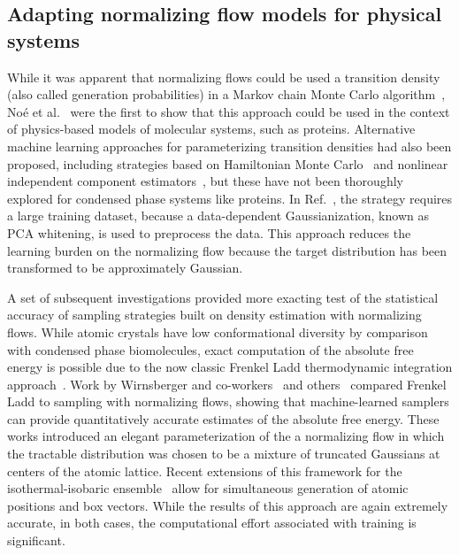 \documentclass[11pt]{article}
\begin{document}
\subsection{Adapting normalizing flow models for physical systems}

While it was apparent that normalizing flows could be used a transition density (also called generation probabilities) in a Markov chain Monte Carlo algorithm~\cite{rezende_variational_2015}, No\'{e} et al.~\cite{noe_boltzmann_2019} were the first to show that this approach could be used in the context of physics-based models of molecular systems, such as proteins.
Alternative machine learning approaches for parameterizing transition densities had also been proposed, including strategies based on Hamiltonian Monte Carlo~\cite{levy_generalizing_2018} and nonlinear independent component estimators~\cite{song_-nice-mc_2017}, but these have not been thoroughly explored for condensed phase systems like proteins. 
In Ref.~\cite{noe_boltzmann_2019}, the strategy requires a large training dataset, because a data-dependent Gaussianization, known as PCA whitening, is used to preprocess the data. 
This approach reduces the learning burden on the normalizing flow because the target distribution has been transformed to be approximately Gaussian. 

A set of subsequent investigations provided more exacting test of the statistical accuracy of sampling strategies built on density estimation with normalizing flows. 
While atomic crystals have low conformational diversity by comparison with condensed phase biomolecules, exact computation of the absolute free energy is possible due to the now classic Frenkel Ladd thermodynamic integration approach~\cite{frenkel_new_1984}.  
Work by Wirnsberger and co-workers~\cite{wirnsberger_normalizing_2021, wirnsberger_estimating_2023} and others~\cite{ahmad_free_2021} compared Frenkel Ladd to sampling with normalizing flows, showing that machine-learned samplers can provide quantitatively accurate estimates of the absolute free energy.
These works introduced an elegant parameterization of the a normalizing flow in which the tractable distribution was chosen to be a mixture of truncated Gaussians at centers of the atomic lattice. 
Recent extensions of this framework for the isothermal-isobaric ensemble~\cite{wirnsberger_estimating_2023} allow for simultaneous generation of atomic positions and box vectors.
While the results of this approach are again extremely accurate, in both cases, the computational effort associated with training is significant.
\end{document}
